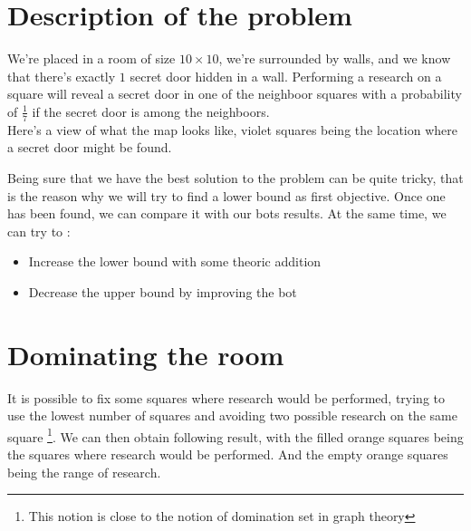 \documentclass{article}
\begin{document}
\section{Description of the problem}
We're placed in a room of size $10 \times 10$, we're surrounded by walls, and
we know that there's exactly $1$ secret door hidden in a wall. Performing a
research on a square will reveal a secret door in one of the neighboor squares
with a probability of $\frac{1}{7}$ if the secret door is among the neighboors.
\\
Here's a view of what the map looks like, violet squares being the location
where a secret door might be found.


\begin{center}
\end{center}

Being sure that we have the best solution to the problem can be quite tricky,
that is the reason why we will try to find a lower bound as first objective.
Once one has been found, we can compare it with our bots results. At the same
time, we can try to :
\begin{itemize}
\item Increase the lower bound with some theoric addition
\item Decrease the upper bound by improving the bot
\end{itemize}

\section{Dominating the room}
It is possible to fix some squares where research would be performed, trying to
use the lowest number of squares and avoiding two possible research on the
same square \footnote{This notion is close to the notion of domination set in
graph theory}. We can then obtain following result, with the filled orange
squares being the squares where research would be performed. And the empty
orange squares being the range of research.
\end{document}
